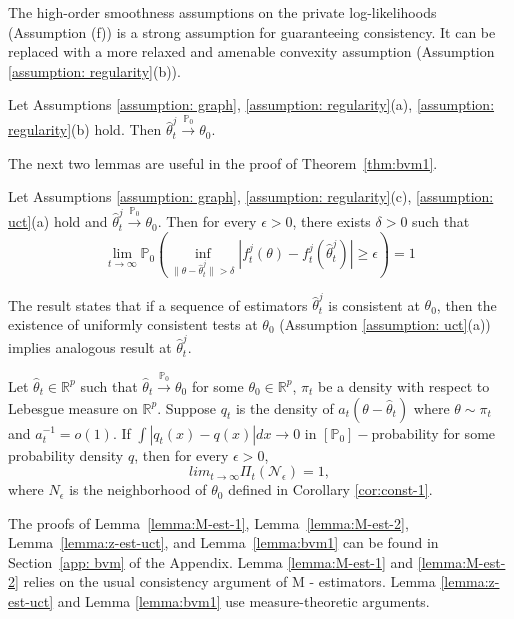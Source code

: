 \documentclass[twoside,11pt]{article}
\numberwithin{equation}{section}
\newcommand{\R}{{\mathbb{R}}}
\newcommand\bP{\mathbb{P}}
\newcommand{\pto}{\stackrel{\bP_0}{\to}}
\begin{document}
{The high-order smoothness assumptions on the private log-likelihoods (Assumption (f)) is a strong assumption for guaranteeing consistency. It can be replaced with a more relaxed and amenable convexity assumption (Assumption \ref{assumption: regularity}(b)). 
\begin{lemma}\label{lemma:M-est-2}
 Let Assumptions  \ref{assumption: graph}, \ref{assumption: regularity}(a), \ref{assumption: regularity}(b) hold. Then $\hat \theta_t^j \pto \theta_0$. 
\end{lemma}

The next two lemmas are useful in the proof of Theorem~\ref{thm:bvm1}. 
\begin{lemma}\label{lemma:z-est-uct}
Let Assumptions \ref{assumption: graph}, \ref{assumption: regularity}(c), \ref{assumption: uct}(a) hold and $\hat \theta_t^j \pto \theta_0$. Then for every $\epsilon > 0$, there exists $\delta > 0$ such that 
\begin{equation*}
\lim_{t \to \infty} \bP_0(\inf_{\|\theta - \hat\theta_t^j\| > \delta}|f_t^j(\theta) - f_t^j(\hat\theta_t^j)| \geq \epsilon) = 1
\end{equation*}
\end{lemma}
The result states that if a sequence of estimators $\hat \theta_t^j$ is consistent at $\theta_0$, then the existence of uniformly consistent tests at $\theta_0$ (Assumption \ref{assumption: uct}(a)) implies analogous result at $\hat \theta_t^j$. 

\begin{lemma}
\label{lemma:bvm1}
Let $\hat \theta_t \in \R^p$ such that $\hat \theta_t \pto \theta_0$ for some $\theta_0 \in \R^p$, $\pi_t$ be a density with respect to Lebesgue measure on $\R^p$. Suppose $q_t$ is the density of $a_t (\theta - \hat \theta_t)$ where $\theta \sim \pi_t$ and $a_t^{-1} = o(1)$. If $\int |q_t(x) - q(x)|dx \to 0$ in $[\bP_0]-$probability for some probability density $q$, then for every $\epsilon > 0$, 
\begin{equation*}
    lim_{t \to \infty}\Pi_t(\mathcal N_\epsilon) = 1,
\end{equation*}
where $N_\epsilon$ is the neighborhood of $\theta_0$ defined in Corollary \ref{cor:const-1}. 
\end{lemma}

The proofs of Lemma~\ref{lemma:M-est-1},  Lemma~\ref{lemma:M-est-2},  Lemma~\ref{lemma:z-est-uct}, and Lemma~\ref{lemma:bvm1} can be found in Section~\ref{app: bvm} of the Appendix. Lemma \ref{lemma:M-est-1}  and \ref{lemma:M-est-2} relies on the usual consistency argument of M - estimators. Lemma \ref{lemma:z-est-uct} and Lemma \ref{lemma:bvm1} use measure-theoretic arguments. 


}
\end{document}
